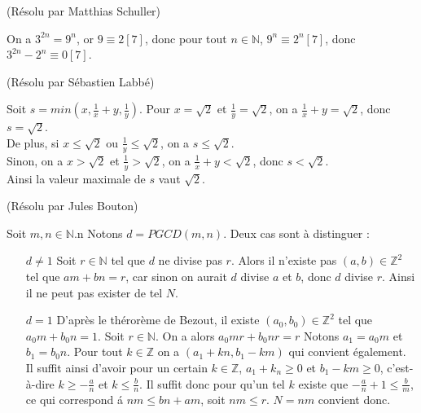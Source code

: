 \begin{sol}[1](Résolu par Matthias Schuller)

On a $3^{2n}=9^n$,
or $9 \equiv 2 [7]$,
donc pour tout $n \in \mathbb{N}$, $9^n \equiv 2^n [7]$,
donc $3^{2n}-2^n \equiv 0 [7]$.

\end{sol}

\begin{sol}[29](Résolu par Sébastien Labbé)

Soit $s=min(x,\frac{1}{x}+y, \frac{1}{y})$.
Pour $x=\sqrt{2}$ et $\frac{1}{y}=\sqrt{2}$, on a $\frac{1}{x}+y=\sqrt{2}$, donc $s=\sqrt{2}$.\\
De plus, si $x\leq \sqrt{2}$ ou $\frac{1}{y} \leq \sqrt{2}$, on a $s \leq \sqrt{2}$.\\
Sinon, on a $x> \sqrt{2}$ et $\frac{1}{y}>\sqrt{2}$, on a $\frac{1}{x}+y<\sqrt{2}$, donc $s<\sqrt{2}$.\\
Ainsi la valeur maximale de $s$ vaut $\sqrt{2}$.


\end{sol}

\begin{sol}[24](Résolu par Jules Bouton)

Soit $m,n \in \mathbb{N}$.n Notons $d= PGCD(m,n)$.
Deux cas sont \`a distinguer :
\begin{itemize}
	\item[$d \not =1$]
		Soit $r \in \mathbb{N}$ tel que $d$ ne divise pas $r$. Alors il n'existe pas $(a,b) \in \mathbb{Z}^2$ tel que $am+bn=r$, car sinon on aurait $d$ divise $a$ et $b$,
		donc $d$ divise $r$.
		Ainsi il ne peut pas exister de tel $N$.

	\item[$d=1$]
		D'apr\`es le th\'eror\`eme de Bezout, il existe $(a_0,b_0) \in \mathbb{Z}^2$ tel que $a_0m+b_0n=1$.
		Soit $r\in \mathbb{N}$. On a alors $a_0mr+b_0nr=r$
		Notons $a_1=a_0m$ et $b_1=b_0n$.
		Pour tout $k \in \mathbb{Z}$ on a $(a_1+kn, b_1-km)$ qui convient \'egalement. 
		Il suffit ainsi d'avoir pour un certain $k \in \mathbb{Z}$, $a_1+k_n \geq 0$ et $b_1-km \geq 0$, c'est-\`a-dire
		$k\geq -\frac{a}{n}$ et $k \leq \frac{b}{n}$.
		Il suffit donc pour qu'un tel $k$ existe que $-\frac{a}{n}+1 \leq \frac{b}{m}$,
		ce qui correspond \'a $nm \leq bn+am$, soit $nm \leq r$.
		$N=nm$ convient donc.
		
	

\end{itemize}



\end{sol}



